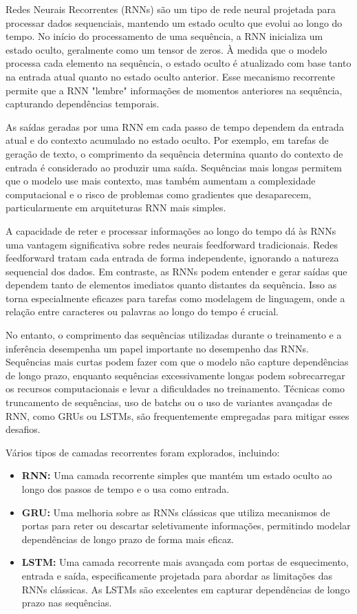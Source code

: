 \documentclass[a4paper,12pt]{article}
\begin{document}
Redes Neurais Recorrentes (RNNs) são um tipo de rede neural projetada para processar dados sequenciais, mantendo um estado oculto que evolui ao longo do tempo. No início do processamento de uma sequência, a RNN inicializa um estado oculto, geralmente como um tensor de zeros. À medida que o modelo processa cada elemento na sequência, o estado oculto é atualizado com base tanto na entrada atual quanto no estado oculto anterior. Esse mecanismo recorrente permite que a RNN "lembre" informações de momentos anteriores na sequência, capturando dependências temporais.

As saídas geradas por uma RNN em cada passo de tempo dependem da entrada atual e do contexto acumulado no estado oculto. Por exemplo, em tarefas de geração de texto, o comprimento da sequência determina quanto do contexto de entrada é considerado ao produzir uma saída. Sequências mais longas permitem que o modelo use mais contexto, mas também aumentam a complexidade computacional e o risco de problemas como gradientes que desaparecem, particularmente em arquiteturas RNN mais simples.

A capacidade de reter e processar informações ao longo do tempo dá às RNNs uma vantagem significativa sobre redes neurais feedforward tradicionais. Redes feedforward tratam cada entrada de forma independente, ignorando a natureza sequencial dos dados. Em contraste, as RNNs podem entender e gerar saídas que dependem tanto de elementos imediatos quanto distantes da sequência. Isso as torna especialmente eficazes para tarefas como modelagem de linguagem, onde a relação entre caracteres ou palavras ao longo do tempo é crucial.

No entanto, o comprimento das sequências utilizadas durante o treinamento e a inferência desempenha um papel importante no desempenho das RNNs. Sequências mais curtas podem fazer com que o modelo não capture dependências de longo prazo, enquanto sequências excessivamente longas podem sobrecarregar os recursos computacionais e levar a dificuldades no treinamento. Técnicas como truncamento de sequências, uso de batchs ou o uso de variantes avançadas de RNN, como GRUs ou LSTMs, são frequentemente empregadas para mitigar esses desafios.

Vários tipos de camadas recorrentes foram explorados, incluindo:
\begin{itemize}
\item \textbf{RNN:} Uma camada recorrente simples que mantém um estado oculto ao longo dos passos de tempo e o usa como entrada.
\item \textbf{GRU:} Uma melhoria sobre as RNNs clássicas que utiliza mecanismos de portas para reter ou descartar seletivamente informações, permitindo modelar dependências de longo prazo de forma mais eficaz.
\item \textbf{LSTM:} Uma camada recorrente mais avançada com portas de esquecimento, entrada e saída, especificamente projetada para abordar as limitações das RNNs clássicas. As LSTMs são excelentes em capturar dependências de longo prazo nas sequências.
\end{itemize}
\end{document}
